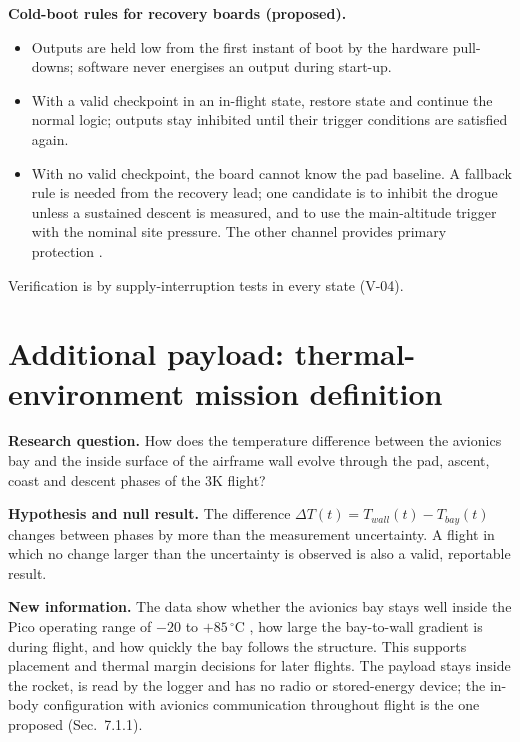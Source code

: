 \textbf{Cold-boot rules for recovery boards (proposed).}
\begin{itemize}
\item Outputs are held low from the first instant of boot by the hardware pull-downs; software never energises an output during start-up.
\item With a valid checkpoint in an in-flight state, restore state and continue the normal logic; outputs stay inhibited until their trigger conditions are satisfied again.
\item With no valid checkpoint, the board cannot know the pad baseline. A fallback rule is needed from the recovery lead; one candidate is to inhibit the drogue unless a sustained descent is measured, and to use the main-altitude trigger with the nominal site pressure. The other channel provides primary protection .
\end{itemize}
Verification is by supply-interruption tests in every state (V-04).

\section{Additional payload: thermal-environment mission definition}
\label{sec:payload}
\textbf{Research question.} How does the temperature difference between the avionics bay and the inside surface of the airframe wall evolve through the pad, ascent, coast and descent phases of the 3K flight?

\textbf{Hypothesis and null result.} The difference $\Delta T(t)=T_{wall}(t)-T_{bay}(t)$ changes between phases by more than the measurement uncertainty. A flight in which no change larger than the uncertainty is observed is also a valid, reportable result.

\textbf{New information.} The data show whether the avionics bay stays well inside the Pico operating range of $-20$ to $+85\,^{\circ}$C \cite{picods}, how large the bay-to-wall gradient is during flight, and how quickly the bay follows the structure. This supports placement and thermal margin decisions for later flights. The payload stays inside the rocket, is read by the logger and has no radio or stored-energy device; the in-body configuration with avionics communication throughout flight is the one proposed \cite{rtc2027app03} (Sec.~7.1.1).

